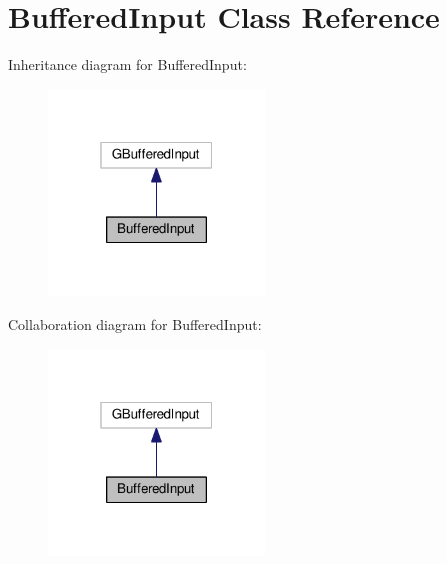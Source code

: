 \hypertarget{classBufferedInput}{}\section{Buffered\+Input Class Reference}
\label{classBufferedInput}


Inheritance diagram for Buffered\+Input\+:\nopagebreak
\begin{figure}[H]
\begin{center}
\leavevmode
\includegraphics[width=163pt]{classBufferedInput__inherit__graph}
\end{center}
\end{figure}


Collaboration diagram for Buffered\+Input\+:\nopagebreak
\begin{figure}[H]
\begin{center}
\leavevmode
\includegraphics[width=163pt]{classBufferedInput__coll__graph}
\end{center}
\end{figure}
